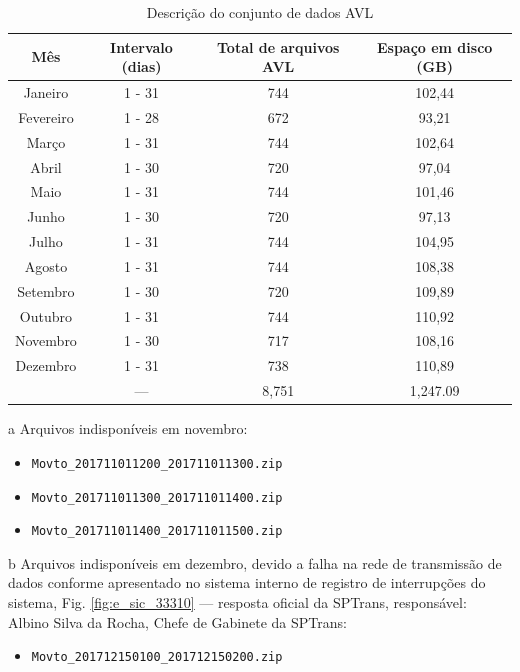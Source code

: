 \documentclass[
	12pt,				%
	oneside,			%
	a4paper,			%
	english,			%
	brazil				%
	]{abntex2ppgsi}
\begin{document}
{{\begin{table}[!htb]
\begin{threeparttable}
\centering
\caption{Descrição do conjunto de dados AVL}
\label{tab:avlDataset}
\begin{tabular}{ c | c | c | c }
\toprule
\textbf{Mês} & \textbf{Intervalo (dias)} & \textbf{Total de arquivos AVL} & \textbf{Espaço em disco (GB)} \\
\midrule
Janeiro\tnote{c} & 1 - 31 & 744 & 102,44 \\
\hline
 Fevereiro & 1 - 28 & 672 & 93,21 \\
\hline
 Março & 1 - 31 & 744 & 102,64 \\
\hline
 Abril & 1 - 30 & 720 & 97,04 \\
\hline
 Maio & 1 - 31 & 744 & 101,46 \\
\hline
 Junho & 1 - 30 & 720 & 97,13 \\
\hline
 Julho & 1 - 31 & 744 & 104,95 \\
\hline
 Agosto & 1 - 31 & 744 & 108,38 \\
\hline
 Setembro & 1 - 30 & 720 & 109,89 \\
\hline
 Outubro & 1 - 31 & 744 & 110,92 \\
\hline
 Novembro\tnote{a} & 1 - 30 & 717 & 108,16 \\
\hline
 Dezembro\tnote{b} & 1 - 31 & 738 & 110,89 \\
\midrule
{} & --- & 8,751 & 1,247.09 \\
\bottomrule
\end{tabular}
\begin{tablenotes}
\item[a]Arquivos indisponíveis em novembro: 
\begin{itemize}
\item \texttt{Movto\_201711011200\_201711011300.zip}
\item \texttt{Movto\_201711011300\_201711011400.zip}
\item \texttt{Movto\_201711011400\_201711011500.zip}
\end{itemize}
\item[b]Arquivos indisponíveis em dezembro, devido a falha na rede de transmissão de dados conforme apresentado no sistema interno de registro de interrupções do sistema, Fig. \ref{fig:e_sic_33310} --- resposta oficial da SPTrans, responsável: Albino Silva da Rocha, Chefe de Gabinete da SPTrans: 
\begin{itemize}
\item \texttt{Movto\_201712150100\_201712150200.zip}

\end{itemize}
\end{tablenotes}
\end{threeparttable}
\end{table}}}
\end{document}
